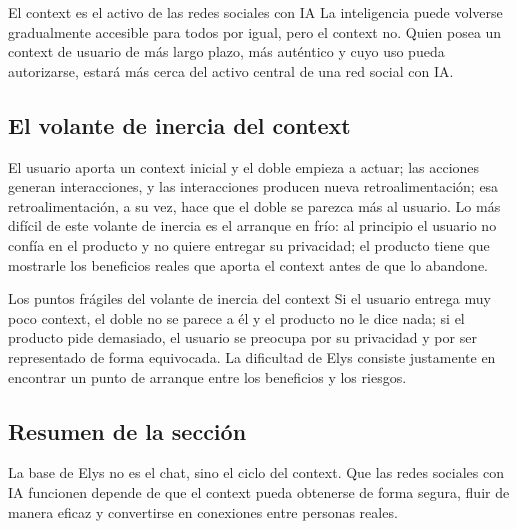 \begin{importantbox}{El context es el activo de las redes sociales con IA}
La inteligencia puede volverse gradualmente accesible para todos por igual, pero el context no. Quien posea un context de usuario de más largo plazo, más auténtico y cuyo uso pueda autorizarse, estará más cerca del activo central de una red social con IA.
\end{importantbox}

\subsection{El volante de inercia del context}

El usuario aporta un context inicial y el doble empieza a actuar; las acciones generan interacciones, y las interacciones producen nueva retroalimentación; esa retroalimentación, a su vez, hace que el doble se parezca más al usuario. Lo más difícil de este volante de inercia es el arranque en frío: al principio el usuario no confía en el producto y no quiere entregar su privacidad; el producto tiene que mostrarle los beneficios reales que aporta el context antes de que lo abandone.

\begin{warningbox}{Los puntos frágiles del volante de inercia del context}
Si el usuario entrega muy poco context, el doble no se parece a él y el producto no le dice nada; si el producto pide demasiado, el usuario se preocupa por su privacidad y por ser representado de forma equivocada. La dificultad de Elys consiste justamente en encontrar un punto de arranque entre los beneficios y los riesgos.
\end{warningbox}

\subsection{Resumen de la sección}

La base de Elys no es el chat, sino el ciclo del context. Que las redes sociales con IA funcionen depende de que el context pueda obtenerse de forma segura, fluir de manera eficaz y convertirse en conexiones entre personas reales.
